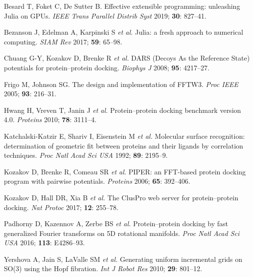 \documentclass[10pt,twocolumn]{article}
\begin{document}
\begin{thebibliography}{}
\small\setlength{\itemsep}{1.5pt}
\item Besard T, Foket C, De Sutter B. Effective extensible programming:
unleashing Julia on GPUs. \textit{IEEE Trans Parallel Distrib Syst}
2019; \textbf{30}: 827--41.

\item Bezanson J, Edelman A, Karpinski S \textit{et al.} Julia: a fresh approach
to numerical computing. \textit{SIAM Rev} 2017; \textbf{59}: 65--98.

\item Chuang G-Y, Kozakov D, Brenke R \textit{et al.} DARS (Decoys As the
Reference State) potentials for protein--protein docking. \textit{Biophys J}
2008; \textbf{95}: 4217--27.

\item Frigo M, Johnson SG. The design and implementation of FFTW3.
\textit{Proc IEEE} 2005; \textbf{93}: 216--31.

\item Hwang H, Vreven T, Janin J \textit{et al.} Protein--protein docking
benchmark version 4.0. \textit{Proteins} 2010; \textbf{78}: 3111--4.

\item Katchalski-Katzir E, Shariv I, Eisenstein M \textit{et al.} Molecular
surface recognition: determination of geometric fit between proteins and their
ligands by correlation techniques. \textit{Proc Natl Acad Sci USA}
1992; \textbf{89}: 2195--9.

\item Kozakov D, Brenke R, Comeau SR \textit{et al.} PIPER: an FFT-based protein
docking program with pairwise potentials. \textit{Proteins} 2006; \textbf{65}:
392--406.

\item Kozakov D, Hall DR, Xia B \textit{et al.} The ClusPro web server for
protein--protein docking. \textit{Nat Protoc} 2017; \textbf{12}: 255--78.

\item Padhorny D, Kazennov A, Zerbe BS \textit{et al.} Protein--protein docking
by fast generalized Fourier transforms on 5D rotational manifolds.
\textit{Proc Natl Acad Sci USA} 2016; \textbf{113}: E4286--93.

\item Yershova A, Jain S, LaValle SM \textit{et al.} Generating uniform
incremental grids on SO(3) using the Hopf fibration. \textit{Int J Robot Res}
2010; \textbf{29}: 801--12.
\end{thebibliography}
\end{document}
